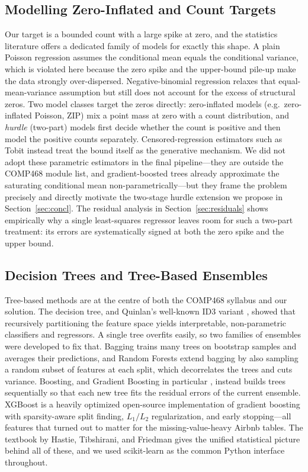 \documentclass[journal]{IEEEtran}
\begin{document}
\subsection{Modelling Zero-Inflated and Count Targets}
\label{sec:zeroinflated}
Our target is a bounded count with a large spike at zero, and the statistics
literature offers a dedicated family of models for exactly this shape. A plain
Poisson regression assumes the conditional mean equals the conditional variance,
which is violated here because the zero spike and the upper-bound pile-up make
the data strongly over-dispersed. Negative-binomial regression relaxes that
equal-mean-variance assumption but still does not account for the excess of
structural zeros. Two model classes target the zeros directly: zero-inflated
models (e.g.\ zero-inflated Poisson, ZIP) mix a point mass at zero with a count
distribution, and \emph{hurdle} (two-part) models first decide whether the count
is positive and then model the positive counts separately. Censored-regression
estimators such as Tobit \cite{tobin1958} instead treat the bound itself as the
generative mechanism. We did not adopt these parametric estimators in the final
pipeline---they are outside the COMP468 module list, and gradient-boosted trees
already approximate the saturating conditional mean non-parametrically---but they
frame the problem precisely and directly motivate the two-stage hurdle extension
we propose in Section~\ref{sec:concl}. The residual analysis in
Section~\ref{sec:residuals} shows empirically why a single least-squares
regressor leaves room for such a two-part treatment: its errors are systematically
signed at both the zero spike and the upper bound.

\subsection{Decision Trees and Tree-Based Ensembles}
Tree-based methods are at the centre of both the COMP468 syllabus and our
solution. The decision tree, and Quinlan's well-known ID3 variant
\cite{quinlan1986}, showed that recursively partitioning the feature space
yields interpretable, non-parametric classifiers and regressors. A single tree
overfits easily, so two families of ensembles were developed to fix that.
Bagging \cite{breiman1996} trains many trees on bootstrap samples and averages
their predictions, and Random Forests \cite{breiman2001} extend bagging by also
sampling a random subset of features at each split, which decorrelates the trees
and cuts variance. Boosting, and Gradient Boosting in particular
\cite{friedman2001}, instead builds trees sequentially so that each new tree
fits the residual errors of the current ensemble. XGBoost \cite{chen2016xgboost}
is a heavily optimized open-source implementation of gradient boosting with
sparsity-aware split finding, $L_1/L_2$ regularization, and early stopping---all
features that turned out to matter for the missing-value-heavy Airbnb tables.
The textbook by Hastie, Tibshirani, and Friedman \cite{hastie2009esl} gives the
unified statistical picture behind all of these, and we used scikit-learn
\cite{pedregosa2011sklearn} as the common Python interface throughout.
\end{document}
